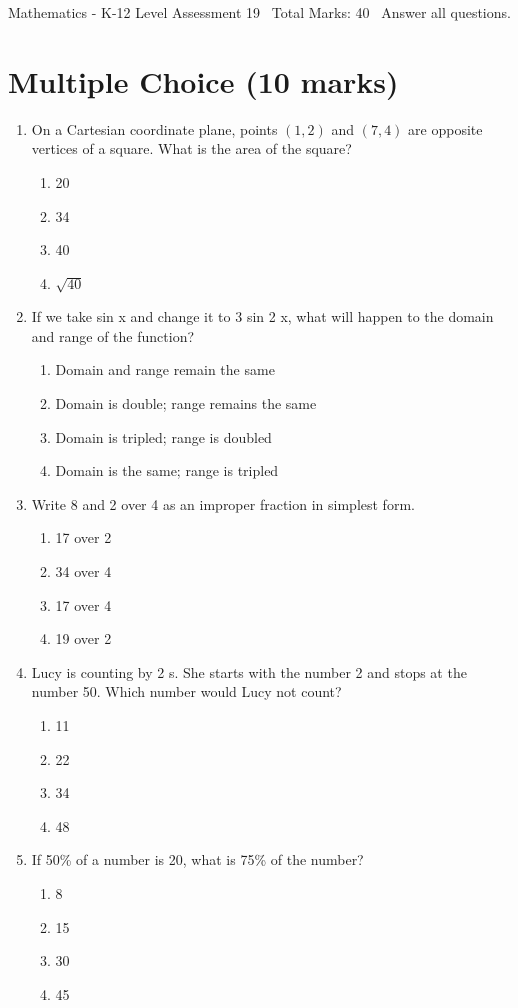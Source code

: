 \documentclass[12pt]{article}
\begin{document}
\begin{center}
Mathematics - K-12 Level Assessment 19 \
Total Marks: 40 \
Answer all questions.
\end{center}

\section*{Multiple Choice (10 marks)}
\begin{enumerate}[label=\arabic*.]
\item On a Cartesian coordinate plane, points $(1,2)$ and $(7, 4)$ are opposite vertices of a square. What is the area of the square?
\begin{enumerate}[label=(\alph*)]
    \item 20
    \item 34
    \item 40
    \item \ensuremath{\sqrt{40}}
\end{enumerate}
\item If we take sin x and change it to 3 sin 2 x, what will happen to the domain and range of the function?
\begin{enumerate}[label=(\alph*)]
    \item Domain and range remain the same
    \item Domain is double; range remains the same
    \item Domain is tripled; range is doubled
    \item Domain is the same; range is tripled
\end{enumerate}
\item Write 8 and 2 over 4 as an improper fraction in simplest form.
\begin{enumerate}[label=(\alph*)]
    \item 17 over 2
    \item 34 over 4
    \item 17 over 4
    \item 19 over 2
\end{enumerate}
\item Lucy is counting by 2 s. She starts with the number 2 and stops at the number 50. Which number would Lucy not count?
\begin{enumerate}[label=(\alph*)]
    \item 11
    \item 22
    \item 34
    \item 48
\end{enumerate}
\item If 50\% of a number is 20, what is 75\% of the number?
\begin{enumerate}[label=(\alph*)]
    \item 8
    \item 15
    \item 30
    \item 45
\end{enumerate}
\end{enumerate}
\end{document}
